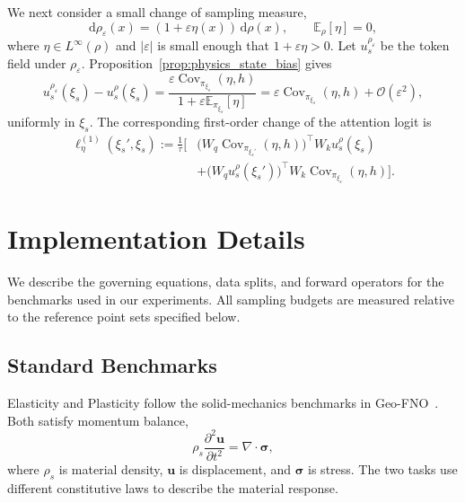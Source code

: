 \documentclass{article}
\begin{document}
We next consider a small change of sampling measure,
\begin{equation}
    \mathrm{d}\rho_{\varepsilon}(x)
    =(1+\varepsilon\eta(x))\,\mathrm{d}\rho(x),
    \qquad
    \mathbb{E}_{\rho}[\eta]=0,
    \label{eq:app_continuous_measure_path}
\end{equation}
where $\eta\in L^{\infty}(\rho)$ and $|\varepsilon|$ is small enough that $1+\varepsilon\eta>0$. Let $u_s^{\rho_{\varepsilon}}$ be the token field under $\rho_{\varepsilon}$. Proposition~\ref{prop:physics_state_bias} gives
\begin{equation}
    u_s^{\rho_{\varepsilon}}(\xi_s)-u_s^{\rho}(\xi_s)
    =\frac{\varepsilon\operatorname{Cov}_{\pi_{\xi_s}}(\eta,h)}{1+\varepsilon\mathbb{E}_{\pi_{\xi_s}}[\eta]}
    =\varepsilon\operatorname{Cov}_{\pi_{\xi_s}}(\eta,h)
    +\mathcal{O}(\varepsilon^2),
    \label{eq:app_continuous_exact_token_shift}
\end{equation}
uniformly in $\xi_s$. The corresponding first-order change of the attention logit is
\begin{align}
    \ell_{\eta}^{(1)}(\xi_s',\xi_s)
    :=\frac{1}{\tau}\Big[&
    \big(W_q\operatorname{Cov}_{\pi_{\xi_s'}}(\eta,h)\big)^{\top}
    W_ku_s^{\rho}(\xi_s)
    \nonumber\\
    &+\big(W_qu_s^{\rho}(\xi_s')\big)^{\top}
    W_k\operatorname{Cov}_{\pi_{\xi_s}}(\eta,h)\Big].
    \label{eq:app_first_order_logit_shift}
\end{align}


\clearpage
\section{Implementation Details}
\label{app:implementation_details}

We describe the governing equations, data splits, and forward operators for the benchmarks used in our experiments. All sampling budgets are measured relative to the reference point sets specified below.

\subsection{Standard Benchmarks}
\label{app:standard_benchmarks}

Elasticity and Plasticity follow the solid-mechanics benchmarks in Geo-FNO~\citep{li2023geofno}. Both satisfy momentum balance,
\begin{equation}
    \rho_s\frac{\partial^2\mathbf{u}}{\partial t^2}
    =\nabla\!\cdot\boldsymbol{\sigma},
    \label{eq:app_solid_balance}
\end{equation}
where $\rho_s$ is material density, $\mathbf{u}$ is displacement, and $\boldsymbol{\sigma}$ is stress. The two tasks use different constitutive laws to describe the material response.
\end{document}
